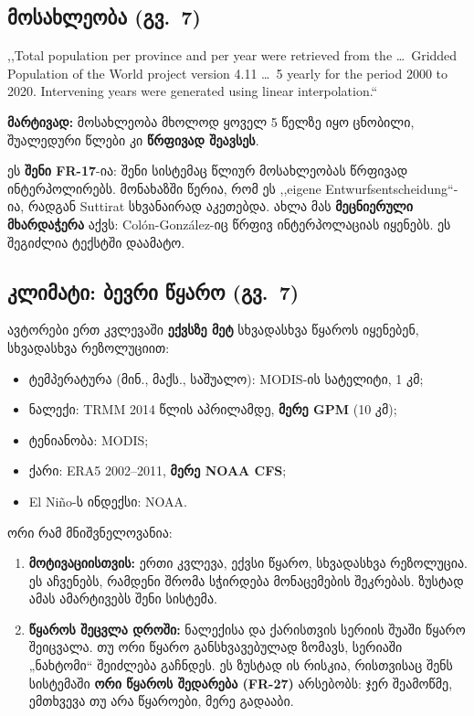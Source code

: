 \documentclass[11pt,a4paper]{article}
\newcommand{\q}[1]{,,#1``}
\begin{document}
\subsection{მოსახლეობა (გვ.\ 7)}
\begin{citata}
\q{Total population per province and per year were retrieved from the \ldots\ Gridded Population of the World
project version 4.11 \ldots\ 5 yearly for the period 2000 to 2020. Intervening years were generated using linear
interpolation.}
\end{citata}
\noindent\textbf{მარტივად:} მოსახლეობა მხოლოდ ყოველ 5 წელზე იყო ცნობილი, შუალედური წლები კი \textbf{წრფივად
შეავსეს}.

\begin{mnishvn}
ეს \textbf{შენი FR-17}-ია: შენი სისტემაც წლიურ მოსახლეობას წრფივად ინტერპოლირებს. მონახაზში წერია, რომ ეს
\q{eigene Entwurfsentscheidung}-ია, რადგან Suttirat სხვანაირად აკეთებდა. ახლა მას \textbf{მეცნიერული მხარდაჭერა}
აქვს: Colón-González-იც წრფივ ინტერპოლაციას იყენებს. ეს შეგიძლია ტექსტში დაამატო.
\end{mnishvn}

\subsection{კლიმატი: ბევრი წყარო (გვ.\ 7)}
ავტორები ერთ კვლევაში \textbf{ექვსზე მეტ} სხვადასხვა წყაროს იყენებენ, სხვადასხვა რეზოლუციით:
\begin{itemize}[nosep]
  \item ტემპერატურა (მინ., მაქს., საშუალო): MODIS-ის სატელიტი, 1 კმ;
  \item ნალექი: TRMM 2014 წლის აპრილამდე, \textbf{მერე GPM} (10 კმ);
  \item ტენიანობა: MODIS;
  \item ქარი: ERA5 2002--2011, \textbf{მერე NOAA CFS};
  \item El Niño-ს ინდექსი: NOAA.
\end{itemize}

\begin{mnishvn}
ორი რამ მნიშვნელოვანია:
\begin{enumerate}[nosep]
  \item \textbf{მოტივაციისთვის:} ერთი კვლევა, ექვსი წყარო, სხვადასხვა რეზოლუცია. ეს აჩვენებს, რამდენი შრომა
        სჭირდება მონაცემების შეკრებას. ზუსტად ამას ამარტივებს შენი სისტემა.
  \item \textbf{წყაროს შეცვლა დროში:} ნალექისა და ქარისთვის სერიის შუაში წყარო შეიცვალა. თუ ორი წყარო
        განსხვავებულად ზომავს, სერიაში „ნახტომი“ შეიძლება გაჩნდეს. ეს ზუსტად ის რისკია, რისთვისაც შენს სისტემაში
        \textbf{ორი წყაროს შედარება (FR-27)} არსებობს: ჯერ შეამოწმე, ემთხვევა თუ არა წყაროები, მერე გადააბი.
\end{enumerate}
\end{mnishvn}
\end{document}
